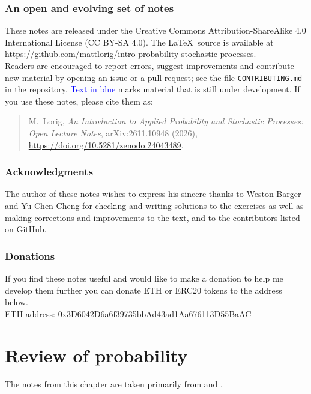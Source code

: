 \documentclass[12pt]{book}
\numberwithin{equation}{chapter}
\theoremstyle{plain}
\numberwithin{theorem}{section}
\theoremstyle{definition}
\numberwithin{exercise}{chapter}
\newcommand{\<}{\langle}
\renewcommand{\>}{\rangle}
\renewcommand{\(}{\left(}
\renewcommand{\)}{\right)}
\renewcommand{\[}{\left[}
\renewcommand{\]}{\right]}
\newcommand{\blu}[1]{\textcolor{blue}{#1}}
\begin{document}
\subsection*{An open and evolving set of notes}
These notes are released under the Creative Commons Attribution-ShareAlike 4.0 International License (CC BY-SA 4.0).
The \LaTeX\ source is available at\\
\url{https://github.com/mattlorig/intro-probability-stochastic-processes}.\\
Readers are encouraged to report errors, suggest improvements and contribute new material by opening an issue or a pull request; see the file \texttt{CONTRIBUTING.md} in the repository.
\blu{Text in blue} marks material that is still under development.
If you use these notes, please cite them as:
\begin{quote}
M.~Lorig, \emph{An Introduction to Applied Probability and Stochastic Processes: Open Lecture Notes}, arXiv:2611.10948 (2026), \url{https://doi.org/10.5281/zenodo.24043489}.
\end{quote}

\subsection*{Acknowledgments}
The author of these notes wishes to express his sincere thanks to Weston Barger and Yu-Chen Cheng for checking and writing solutions to the exercises as well as making corrections and improvements to the text, and to the contributors listed on GitHub.

\subsection*{Donations}
If you find these notes useful and would like to make a donation to help me develop them further you can donate ETH or ERC20 tokens to the address below.\\[0.25em]
\underline{ETH address}: 0x3D6042D6a6f39735bbAd43ad1Aa676113D55BaAC


\mainmatter

%
%

\chapter{Review of probability}
\label{chapter:probability.review}
The notes from this chapter are taken primarily from \cite[Chapter 1]{shreve2004} and \cite[Chapters 1--5]{gs2001}.
\end{document}
